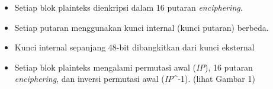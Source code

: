 \documentclass{article}
\begin{document}

\begin{itemize}
    \item Setiap blok plainteks dienkripsi dalam 16 putaran \textit{enciphering}.
    \item Setiap putaran menggunakan kunci internal (kunci putaran) berbeda.
    \item Kunci internal sepanjang 48-bit dibangkitkan dari kunci eksternal
    \item Setiap blok plainteks mengalami permutasi awal (\textit{IP}), 16 putaran \textit{enciphering}, dan inversi permutasi awal (\textit{IP}^{-1}). (lihat Gambar 1)
\end{itemize}
\end{document}
